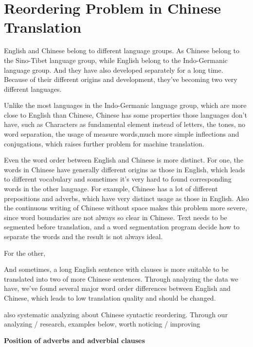 \section{Reordering Problem in Chinese Translation}
\label{ch:ReorderingApproach:sec:Problem}

English and Chinese belong to different language groups. As Chinese belong to the Sino-Tibet language group, while English belong to the Indo-Germanic language group. And they have also developed separately for a long time. Because of their different origins and development, they've becoming two very different languages.

Unlike the most languages in the Indo-Germanic language group, which are more close to English than Chinese, Chinese has some properties those languages don't have, such as Characters as fundamental element instead of letters, the tones, no word separation, the usage of measure words,much more simple inflections and conjugations, which raises further problem for machine translation.

Even the word order between English and Chinese is more distinct. For one, the words in Chinese have generally different origins as those in English, which leads to different vocabulary and sometimes it's very hard to found corresponding words in the other language. For example, Chinese has a lot of different prepositions and adverbs, which have very distinct usage as those in English. Also the continuous writing of Chinese without space makes this problem more severe, since word boundaries are not always so clear in Chinese. Text needs to be segmented before translation, and a word segmentation program decide how to separate the words and the result is not always ideal.

For the other, 

And sometimes, a long English sentence with clauses is more suitable to be translated into two of more Chinese sentences. Through analyzing the data we have, we've found several major word order differences between English and Chinese, which leads to low translation quality and should be changed. 


\cite{syntactic} also systematic analyzing about Chinese syntactic reordering. Through our analyzing / research, examples below, worth noticing / improving

\textbf{Position of adverbs and adverbial clauses}
